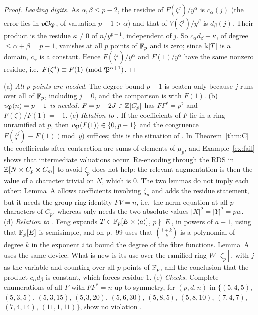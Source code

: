 \begin{proof}
\emph{Leading digits.} As $\alpha,\beta\le p-2$, the residue of
$F(\zeta^j)/y^\alpha$ is $c_\alpha(j)$ (the error lies in $p\mathcal{O}_{\mathfrak{P}}$, of
valuation $p-1>\alpha$) and that of $V(\zeta^j)/y^\beta$ is $d_\beta(j)$.
Their product is the residue $\kappa\ne0$ of $n/y^{p-1}$, independent of
$j$. So $c_\alpha d_\beta-\kappa$, of degree $\le\alpha+\beta=p-1$,
vanishes at all $p$ points of $\mathbb{F}_p$ and is zero; since $\Bbbk[T]$ is a
domain, $c_\alpha$ is a constant. Hence $F(\zeta^j)/y^\alpha$ and
$F(1)/y^\alpha$ have the same nonzero residue, i.e.\
$F(\zeta^j)\equiv F(1)\pmod{\mathfrak{P}^{\alpha+1}}$.
\end{proof}

\begin{remark}\label{rem:A}
(a) \emph{All $p$ points are needed.} The degree bound $p-1$ is beaten
only because $j$ runs over all of $\mathbb{F}_p$, including $j=0$, and the
comparison is with $F(1)$.
(b) \emph{$v_{\mathfrak{P}}(n)=p-1$ is needed.} $F=p-2J\in\mathbb{Z}[C_p]$ has $FF^*=p^2$
and $F(\zeta)/F(1)=-1$.
(c) \emph{Relation to \cite[Lemma~3.11]{LeungSchmidtZhang2023}.} If the
coefficients of $F$ lie in a ring unramified at $p$, then
$v_{\mathfrak{P}}(F(1))\in\{0,p-1\}$ and the congruence $F(\zeta^j)\equiv
F(1)\pmod y$ suffices; this is the situation of
\cite[Lemma~3.11]{LeungSchmidtZhang2023}. In Theorem~\ref{thm:C} the
coefficients after contraction are sums of elements of $\mu_p$, and
Example~\ref{ex:fail} shows that intermediate valuations occur.
Re-encoding through the RDS in $\mathbb{Z}[N\times C_p\times C_m]$ to avoid
$\zeta_p$ does not help: the relevant augmentation is then the value of a
character trivial on $N$, which is $0$. The two lemmas do not imply each
other: Lemma~A allows coefficients involving $\zeta_p$ and adds the
residue statement, but it needs the group-ring identity $FV=n$, i.e.\ the
norm equation at all $p$ characters of $C_p$, whereas
\cite[Lemma~3.11]{LeungSchmidtZhang2023} only needs the two absolute
values $|X|^2=|Y|^2=pw$.
(d) \emph{Relation to \cite{Feng2009}.} Feng \cite[Lemmas~2, 3]{Feng2009}
expands $T\in\mathbb{F}_p[E\times\langle a\rangle]$, $p\nmid|E|$, in powers of
$a-1$, using that $\mathbb{F}_p[E]$ is semisimple, and on p.~99 uses that
$\binom{i+k}{k}$ is a polynomial of degree $k$ in the exponent $i$ to
bound the degree of the fibre functions. Lemma~A uses the same device.
What is new is its use over the ramified ring $W[\zeta_p]$, with $j$ as
the variable and counting over all $p$ points of $\mathbb{F}_p$, and the
conclusion that the product $c_\alpha d_\beta$ is constant, which forces
residue $1$.
(e) \emph{Checks.} Complete enumerations of all $F$ with $FF^*=n$ up to
symmetry, for $(p,d,n)$ in $\{(5,4,5)$, $(5,3,5)$, $(5,3,15)$,
$(5,3,20)$, $(5,6,30)$, $(5,8,5)$, $(5,8,10)$, $(7,4,7)$, $(7,4,14)$,
$(11,1,11)\}$, show no violation \deptag{Comp}.
\end{remark}

